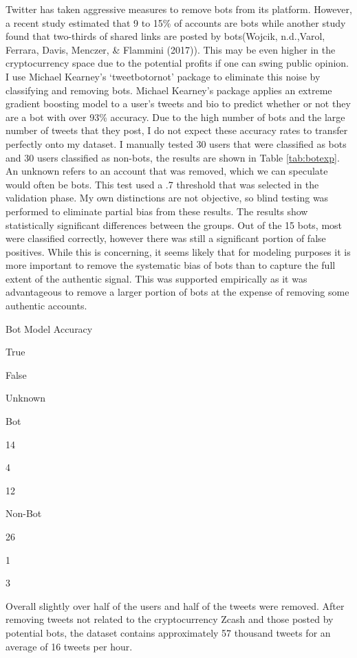 \documentclass[12pt,twoside]{dukestatscithesis}
\begin{document}
Twitter has taken aggressive measures to remove bots from its platform.
However, a recent study estimated that 9 to 15\% of accounts are bots
while another study found that two-thirds of shared links are posted by
bots(Wojcik, n.d.,Varol, Ferrara, Davis, Menczer, \& Flammini (2017)).
This may be even higher in the cryptocurrency space due to the potential
profits if one can swing public opinion. I use Michael Kearney's
`tweetbotornot' package to eliminate this noise by classifying and
removing bots. Michael Kearney's package applies an extreme gradient
boosting model to a user's tweets and bio to predict whether or not they
are a bot with over 93\% accuracy. Due to the high number of bots and
the large number of tweets that they post, I do not expect these
accuracy rates to transfer perfectly onto my dataset. I manually tested
30 users that were classified as bots and 30 users classified as
non-bots, the results are shown in Table \ref{tab:botexp}. An unknown
refers to an account that was removed, which we can speculate would
often be bots. This test used a .7 threshold that was selected in the
validation phase. My own distinctions are not objective, so blind
testing was performed to eliminate partial bias from these results. The
results show statistically significant differences between the groups.
Out of the 15 bots, most were classified correctly, however there was
still a significant portion of false positives. While this is
concerning, it seems likely that for modeling purposes it is more
important to remove the systematic bias of bots than to capture the full
extent of the authentic signal. This was supported empirically as it was
advantageous to remove a larger portion of bots at the expense of
removing some authentic accounts.

\label{tab:botexp}Bot Model Accuracy

True

False

Unknown

Bot

14

4

12

Non-Bot

26

1

3

Overall slightly over half of the users and half of the tweets were
removed. After removing tweets not related to the cryptocurrency Zcash
and those posted by potential bots, the dataset contains approximately
57 thousand tweets for an average of 16 tweets per hour.
\end{document}
